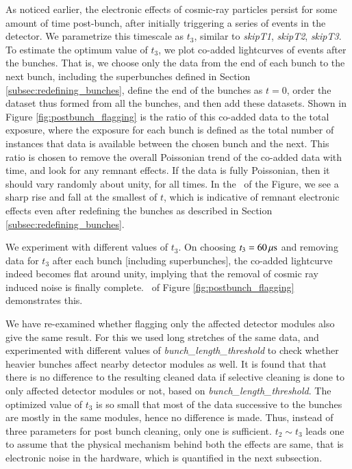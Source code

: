 As noticed earlier, the electronic effects of cosmic-ray particles persist for some amount of time post-bunch, after initially triggering a series of events in the detector. We parametrize this timescale  as $t_3$, similar to \emph{skipT1}, \emph{skipT2}, \emph{skipT3}. To estimate the optimum value of $t_3$, we plot co-added lightcurves of events after the bunches. That is, we choose only the data from the end of each bunch to the next bunch, including the superbunches defined in Section \ref{subsec:redefining_bunches}, define the end of the bunches as $t = 0$, order the dataset thus formed from all the bunches, and then add these datasets. Shown in Figure \ref{fig:postbunch_flagging} is the ratio of this co-added data to the total exposure, where the exposure for each bunch is defined as the total number of instances that data is available between the chosen bunch and the next. This ratio is chosen to remove the overall Poissonian trend of the co-added data with time, and look for any remnant effects. If the data is fully Poissonian, then it should vary randomly about unity, for all times. In the \eL\ of the Figure, we see a sharp rise and fall at the smallest of $t$, which is indicative of remnant electronic effects even after redefining the bunches as described in Section \ref{subsec:redefining_bunches}.

We experiment with different values of $t_3$. On choosing  $t_3 = 60 \, {\rm \mu s}$ and removing data for $t_3$ after each bunch [including superbunches], the co-added lightcurve indeed becomes flat around unity, implying that the removal of cosmic ray induced noise is finally complete. \eR\ of Figure \ref{fig:postbunch_flagging} demonstrates this.

We have re-examined whether flagging only the affected detector modules also give the same result. For this we used long stretches of the same data, and experimented with different values of \emph{bunch\_length\_threshold} to check whether heavier bunches affect nearby detector modules as well. It is found that that there is no difference to the resulting cleaned data if selective cleaning is done to only affected detector modules or not, based on \emph{bunch\_length\_threshold}. The optimized value of $t_3$ is so small that most of the data successive to the bunches are mostly in the same modules, hence no difference is made. Thus, instead of three parameters for post bunch cleaning, only one is sufficient. $t_2 \sim t_3$ leads one to assume that the physical mechanism behind both the effects are same, that is electronic noise in the hardware, which is quantified in the next subsection.

